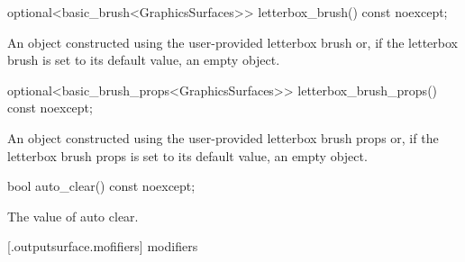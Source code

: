 %
\begin{itemdecl}
optional<basic_brush<GraphicsSurfaces>> letterbox_brush() const noexcept;
\end{itemdecl}
\begin{itemdescr}
\pnum
\returns
An  object constructed using the user-provided letterbox brush or, if the letterbox brush is set to its default value, an empty  object.
\end{itemdescr}

%
\begin{itemdecl}
optional<basic_brush_props<GraphicsSurfaces>> letterbox_brush_props() const noexcept;
\end{itemdecl}
\begin{itemdescr}
\pnum
\returns
An  object constructed using the user-provided letterbox brush props or, if the letterbox brush props is set to its default value, an empty  object.
\end{itemdescr}

%
\begin{itemdecl}
bool auto_clear() const noexcept;
\end{itemdecl}
\begin{itemdescr}
\pnum
\returns
The value of auto clear.
\end{itemdescr}

 [\iotwod.outputsurface.mofifiers] { modifiers}


